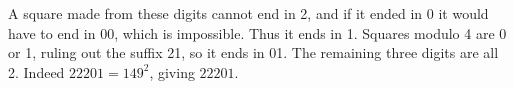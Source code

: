 A square made from these digits cannot end in 2, and if it ended in 0 it would have to end in 00, which is impossible. Thus it ends in 1. Squares modulo 4 are 0 or 1, ruling out the suffix 21, so it ends in 01. The remaining three digits are all 2. Indeed $22201=149^2$, giving $\boxed{22201}$.
